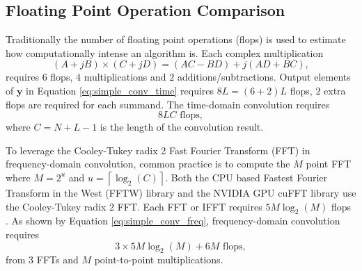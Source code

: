 \subsection{Floating Point Operation Comparison}
Traditionally the number of floating point operations (flops) is used to estimate how computationally intense an algorithm is. 
Each complex multiplication  
\begin{equation}
(A+jB)\times(C+jD) = (AC-BD)+j(AD+BC),
\end{equation}
requires $6$ flops, $4$ multiplications and $2$ additions/subtractions.
Output elements of $\mathbf{y}$ in Equation \eqref{eq:simple_conv_time} requires $8L = (6+2)L$ flops, $2$ extra flops are required for each summand.
The time-domain convolution requires
\begin{equation}
8LC \text{ flops},
\label{eq:flops_time_domain_conv}
\end{equation}
where $C=N+L-1$ is the length of the convolution result.

To leverage the Cooley-Tukey radix 2 Fast Fourier Transform (FFT) in frequency-domain convolution, common practice is to compute the $M$ point FFT where $M = 2^u$ and $u = {\left\lceil \log_2{\left(C\right)}  \right\rceil}$.
Both the CPU based Fastest Fourier Transform in the West (FFTW) library and the NVIDIA GPU cuFFT library use the Cooley-Tukey radix 2 FFT.
Each FFT or IFFT requires $5M\log_2(M)$ flops \cite{FFTW:2017,cooley1965algorithm}.
As shown by Equation \eqref{eq:simple_conv_freq}, frequency-domain convolution requires 
\begin{equation}
3\times5M\log_2(M)+6M \text{ flops},
\label{eq:flops_freq_domain_conv}
\end{equation}
from $3$ FFTs and $M$ point-to-point multiplications.

